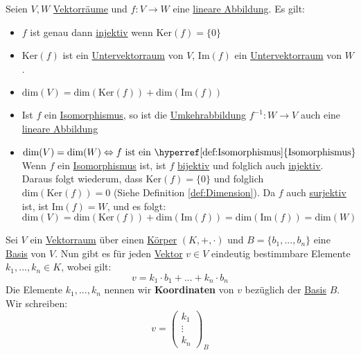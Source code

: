 \documentclass[../../main.tex]{subfiles}
\begin{document}
	\begin{theorem}
		Seien $V, W$ \hyperref[def:Vektorraum]{Vektorräume} und $f: V \rightarrow W$ eine \hyperref[def:LineareAbbildung]{lineare Abbildung}. Es gilt:
		\begin{itemize}
			\item $f$ ist genau dann \hyperref[def:Injektiv]{injektiv} wenn $\textrm{Ker}(f)=\{0\}$
			\item $\textrm{Ker}(f)$ ist ein \hyperref[def:Untervektorraum]{Untervektorraum} von $V$, $\textrm{Im}(f)$ ein \hyperref[def:Untervektorraum]{Untervektorraum} von $W$. 
			\item $\textrm{dim}(V) = \textrm{dim}(\textrm{Ker}(f)) + \textrm{dim}(\textrm{Im}(f))$
			\item Ist $f$ ein \hyperref[def:Isomorphismus]{Isomorphismus}, so ist die \hyperref[def:Umkehrabbildung]{Umkehrabbildung} $f^{-1}: W \rightarrow V$ auch eine \hyperref[def:LineareAbbildung]{lineare Abbildung}
			\item $\textrm{dim}(V)=\textrm{dim}(W) \Leftrightarrow f \textrm{ ist ein \hyperref[def:Isomorphismus]{Isomorphismus}}$\\
				Wenn $f$ ein \hyperref[def:Isomorphismus]{Isomorphismus} ist, ist $f$ \hyperref[def:Bijektiv]{bijektiv} und folglich auch \hyperref[def:Injektiv]{injektiv}. Daraus folgt wiederum, dass $\textrm{Ker}(f)=\{0\}$ und folglich $\textrm{dim}(\textrm{Ker}(f))=0$ (Siehe Definition \ref{def:Dimension}). Da $f$ auch \hyperref[def:Surjketiv]{surjektiv} ist, ist $\textrm{Im}(f)=W$, und es folgt: $\textrm{dim}(V)=\textrm{dim}(\textrm{Ker}(f)) + \textrm{dim}(\textrm{Im}(f)) = \textrm{dim}(\textrm{Im}(f)) = \textrm{dim}(W)$
		\end{itemize}
	\end{theorem}

	\begin{definition}[Koordinaten]
		\label{def:Koordinaten}
		Sei $V$ ein \hyperref[def:Vektorraum]{Vektorraum} über einen \hyperref[def:Körper]{Körper} $(K,+,\cdot)$ und $B=\{b_1,...,b_n\}$ eine \hyperref[def:Basis]{Basis} von $V$. Nun gibt es für jeden \hyperref[def:Vektor]{Vektor} $v \in V$ eindeutig bestimmbare Elemente $k_1,...,k_n \in K$, wobei gilt: $$v = k_1 \cdot b_1 + ... + k_n \cdot b_n$$ Die Elemente $k_1,...,k_n$ nennen wir \textbf{Koordinaten} von $v$ bezüglich der \hyperref[def:Basis]{Basis} $B$. Wir schreiben: $$v = \begin{pmatrix}k_1 \\ \vdots \\ k_n \end{pmatrix}_B$$
	\end{definition}
\end{document}
